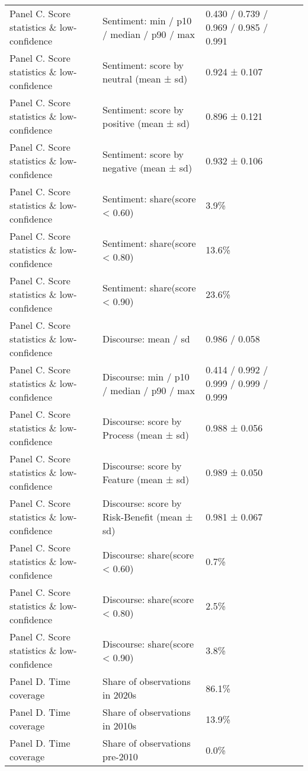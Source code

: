\begin{longtable}{p{3.2cm}p{7.8cm}p{4.5cm}p{1.6cm}p{1.6cm}p{2.0cm}}
Panel C. Score statistics \& low-confidence & Sentiment: min / p10 / median / p90 / max & 0.430 / 0.739 / 0.969 / 0.985 / 0.991 &  &  &  \\
Panel C. Score statistics \& low-confidence & Sentiment: score by neutral (mean ± sd) & 0.924 ± 0.107 &  &  &  \\
Panel C. Score statistics \& low-confidence & Sentiment: score by positive (mean ± sd) & 0.896 ± 0.121 &  &  &  \\
Panel C. Score statistics \& low-confidence & Sentiment: score by negative (mean ± sd) & 0.932 ± 0.106 &  &  &  \\
Panel C. Score statistics \& low-confidence & Sentiment: share(score < 0.60) & 3.9\% &  &  &  \\
Panel C. Score statistics \& low-confidence & Sentiment: share(score < 0.80) & 13.6\% &  &  &  \\
Panel C. Score statistics \& low-confidence & Sentiment: share(score < 0.90) & 23.6\% &  &  &  \\
Panel C. Score statistics \& low-confidence & Discourse: mean / sd & 0.986 / 0.058 &  &  &  \\
Panel C. Score statistics \& low-confidence & Discourse: min / p10 / median / p90 / max & 0.414 / 0.992 / 0.999 / 0.999 / 0.999 &  &  &  \\
Panel C. Score statistics \& low-confidence & Discourse: score by Process (mean ± sd) & 0.988 ± 0.056 &  &  &  \\
Panel C. Score statistics \& low-confidence & Discourse: score by Feature (mean ± sd) & 0.989 ± 0.050 &  &  &  \\
Panel C. Score statistics \& low-confidence & Discourse: score by Risk-Benefit (mean ± sd) & 0.981 ± 0.067 &  &  &  \\
Panel C. Score statistics \& low-confidence & Discourse: share(score < 0.60) & 0.7\% &  &  &  \\
Panel C. Score statistics \& low-confidence & Discourse: share(score < 0.80) & 2.5\% &  &  &  \\
Panel C. Score statistics \& low-confidence & Discourse: share(score < 0.90) & 3.8\% &  &  &  \\
Panel D. Time coverage & Share of observations in 2020s & 86.1\% &  &  &  \\
Panel D. Time coverage & Share of observations in 2010s & 13.9\% &  &  &  \\
Panel D. Time coverage & Share of observations pre-2010 & 0.0\% &  &  &  \\

\end{longtable}
